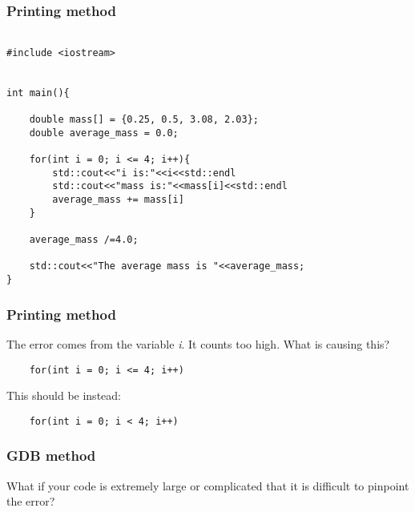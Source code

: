 \documentclass{beamer}
\begin{document}
\begin{frame}[fragile]
	\frametitle{Printing method}
\pause
\begin{lstlisting}

#include <iostream>


int main(){

	double mass[] = {0.25, 0.5, 3.08, 2.03};
	double average_mass = 0.0;
	
	for(int i = 0; i <= 4; i++){
		std::cout<<"i is:"<<i<<std::endl
		std::cout<<"mass is:"<<mass[i]<<std::endl
		average_mass += mass[i]
	}

	average_mass /=4.0;

	std::cout<<"The average mass is "<<average_mass;
}

\end{lstlisting}

\end{frame}


\begin{frame}[fragile]
	\frametitle{Printing method}
	\pause
	
	The error comes from the variable \emph{i}. It counts too high. What is causing this?\pause
	
	\begin{lstlisting}
	for(int i = 0; i <= 4; i++)
	\end{lstlisting}
	\pause
	This should be instead:
	\begin{lstlisting}
	for(int i = 0; i < 4; i++)
	\end{lstlisting}	
	\pause
	
\end{frame}


\begin{frame}[fragile]
	\frametitle{GDB method}
	\pause
	
	What if your code is extremely large or complicated that it is difficult to pinpoint the error?

	
	
	
\end{frame}
\end{document}
